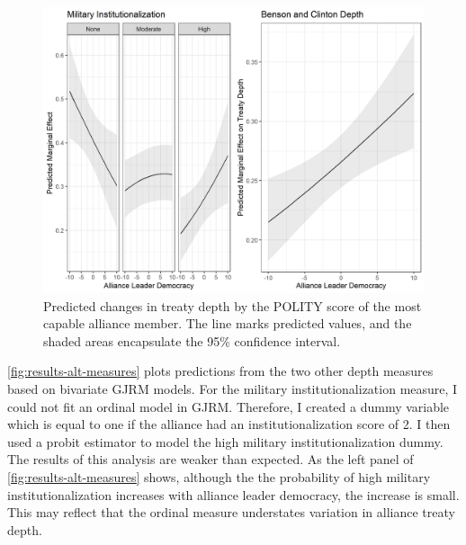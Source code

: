 \documentclass[12pt]{article}
\begin{document}
\begin{figure}
\includegraphics[width=.95\textwidth]{results-alt-measures-sep.png}  
\caption{Predicted changes in treaty depth by the POLITY score of the most capable alliance member. The line marks predicted values, and the shaded areas encapsulate the 95\% confidence interval.}
\label{fig:results-alt-measures-sep}
\end{figure}


\autoref{fig:results-alt-measures} plots predictions from the two other depth measures based on bivariate GJRM models. 
For the military institutionalization measure, I could not fit an ordinal model in GJRM. 
Therefore, I created a dummy variable which is equal to one if the alliance had an institutionalization score of 2. 
I then used a probit estimator to model the high military institutionalization dummy. 
The results of this analysis are weaker than expected. 
As the left panel of \autoref{fig:results-alt-measures} shows, although the the probability of high military institutionalization increases with alliance leader democracy, the increase is small. 
This may reflect that the ordinal measure understates variation in alliance treaty depth. 
\end{document}
